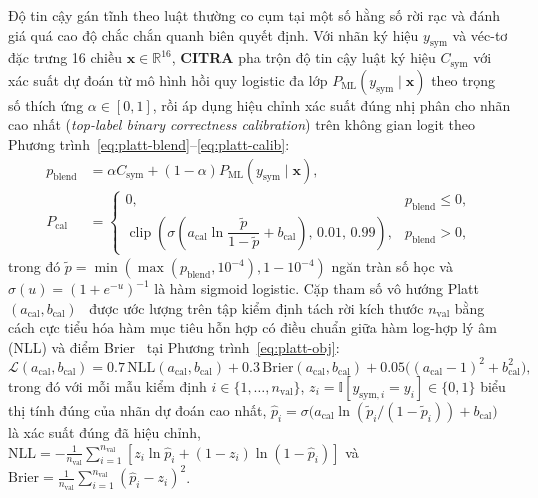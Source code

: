 Độ tin cậy gán tĩnh theo luật thường co cụm tại một số hằng số rời rạc và đánh giá quá cao độ chắc chắn quanh biên quyết định. Với nhãn ký hiệu $y_{\text{sym}}$ và véc-tơ đặc trưng 16 chiều $\mathbf{x} \in \mathbb{R}^{16}$, \textbf{CITRA} pha trộn độ tin cậy luật ký hiệu $C_{\text{sym}}$ với xác suất dự đoán từ mô hình hồi quy logistic đa lớp $P_{\text{ML}}(y_{\text{sym}} \mid \mathbf{x})$ theo trọng số thích ứng $\alpha \in [0, 1]$, rồi áp dụng hiệu chỉnh xác suất đúng nhị phân cho nhãn cao nhất (\textit{top-label binary correctness calibration}) trên không gian logit theo Phương trình~\eqref{eq:platt-blend}--\eqref{eq:platt-calib}:
\begin{align}
p_{\text{blend}} &= \alpha C_{\text{sym}} + (1 - \alpha) P_{\text{ML}}(y_{\text{sym}} \mid \mathbf{x}), \label{eq:platt-blend}\\
P_{\text{cal}} &= \begin{cases}
0, & p_{\text{blend}} \le 0,\\
\operatorname{clip}\!\left(\sigma\!\left(a_{\text{cal}} \ln\dfrac{\tilde{p}}{1 - \tilde{p}} + b_{\text{cal}}\right),\, 0.01,\, 0.99\right), & p_{\text{blend}} > 0,
\end{cases} \label{eq:platt-calib}
\end{align}
trong đó $\tilde{p} = \min(\max(p_{\text{blend}}, 10^{-4}), 1 - 10^{-4})$ ngăn tràn số học và $\sigma(u) = (1 + e^{-u})^{-1}$ là hàm sigmoid logistic. Cặp tham số vô hướng Platt $(a_{\text{cal}}, b_{\text{cal}})$~\cite{platt1999} được ước lượng trên tập kiểm định tách rời kích thước $n_{\text{val}}$ bằng cách cực tiểu hóa hàm mục tiêu hỗn hợp có điều chuẩn giữa hàm log-hợp lý âm (NLL) và điểm Brier~\cite{brier1950} tại Phương trình~\eqref{eq:platt-obj}:
\begin{equation}\label{eq:platt-obj}
\mathcal{L}(a_{\text{cal}}, b_{\text{cal}}) = 0.7\,\mathrm{NLL}(a_{\text{cal}}, b_{\text{cal}}) + 0.3\,\mathrm{Brier}(a_{\text{cal}}, b_{\text{cal}}) + 0.05\bigl((a_{\text{cal}} - 1)^2 + b_{\text{cal}}^2\bigr),
\end{equation}
trong đó với mỗi mẫu kiểm định $i \in \{1, \dots, n_{\text{val}}\}$, $z_i = \mathbb{I}[y_{\text{sym},i} = y_i] \in \{0, 1\}$ biểu thị tính đúng của nhãn dự đoán cao nhất, $\hat{p}_i = \sigma\bigl(a_{\text{cal}}\ln(\tilde{p}_i / (1 - \tilde{p}_i)) + b_{\text{cal}}\bigr)$ là xác suất đúng đã hiệu chỉnh, $\mathrm{NLL} = -\frac{1}{n_{\text{val}}}\sum_{i=1}^{n_{\text{val}}}[z_i\ln\hat{p}_i + (1 - z_i)\ln(1 - \hat{p}_i)]$ và $\mathrm{Brier} = \frac{1}{n_{\text{val}}}\sum_{i=1}^{n_{\text{val}}}(\hat{p}_i - z_i)^2$.

